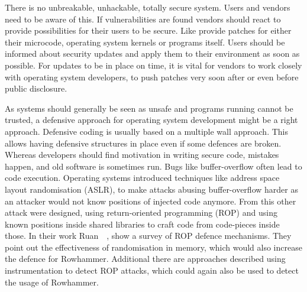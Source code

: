 There is no unbreakable, unhackable, totally secure system. Users and vendors
need to be aware of this. If vulnerabilities are found vendors should react to
provide possibilities for their users to be secure. Like provide patches for
either their microcode, operating system kernels or programs itself. Users
should be informed about security updates and apply them to their environment
as soon as possible. For updates to be in place on time, it is vital for
vendors to work closely with operating system developers, to push patches very
soon after or even before public disclosure.

As systems should generally be seen as unsafe and programs running cannot be
trusted, a defensive approach for operating system development might be a right
approach. Defensive coding is usually based on a multiple wall approach. This
allows having defensive structures in place even if some defences are broken.
Whereas developers should find motivation in writing secure code, mistakes
happen, and old software is sometimes run. Bugs like buffer-overflow often lead
to code execution. Operating systems introduced techniques like address space
layout randomisation (ASLR), to make attacks abusing buffer-overflow harder as
an attacker would not know positions of injected code anymore. From this other
attack were designed, using return-oriented programming (ROP) and using known
positions inside shared libraries to craft code from code-pieces inside those.
In their work Ruan~\etal~\cite{ropsur}, show a survey of ROP defence mechanisms.
They point out the effectiveness of randomisation in memory, which would also
increase the defence for Rowhammer. Additional there are approaches described
using instrumentation to detect ROP attacks, which could again also be used to
detect the usage of Rowhammer.


